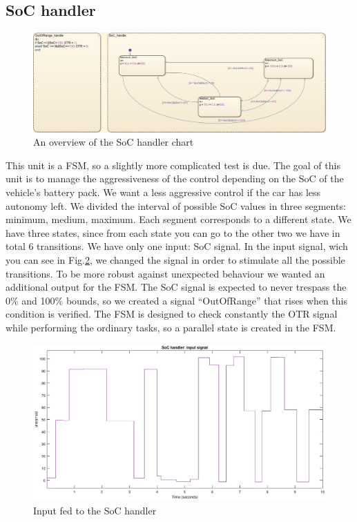 \documentclass[12pt,a4paper]{report}
\begin{document}
\subsection{SoC handler}
\begin{figure}[!h]
	\centering
	\includegraphics[scale=0.34]{SoC_handle_subs.jpg}
	\caption{An overview of the SoC handler chart}
	\label{SoC_handle_subs}
\end{figure}
\FloatBarrier
This unit is a FSM, so a slightly more complicated test is due. The goal of this unit is to manage the aggressiveness of the control depending on the SoC of the vehicle’s battery pack. We want a less aggressive control if the car has less autonomy left. We divided the interval of possible SoC values in three segments: minimum, medium, maximum. Each segment corresponds to a different state. We have three states, since from each state you can go to the other two we have in total 6 transitions.  We have only one input: SoC signal. In the input signal, wich you can see in Fig.\ref{SoC_handle_input}, we changed the signal in order to stimulate all the possible transitions. 
To be more robust against unexpected behaviour we wanted an additional output for the FSM. The SoC signal is expected to never trespass the 0\% and 100\% bounds, so we created a signal “OutOfRange” that rises when this condition is verified. The FSM is designed to check constantly the OTR signal while performing the ordinary tasks, so a parallel state is created in the FSM.
\begin{figure}[!h]
	\centering
	\includegraphics[scale=0.34]{SoC_handle_input.eps}
	\caption{Input fed to the SoC handler }
	\label{SoC_handle_input}
\end{figure}
\end{document}
